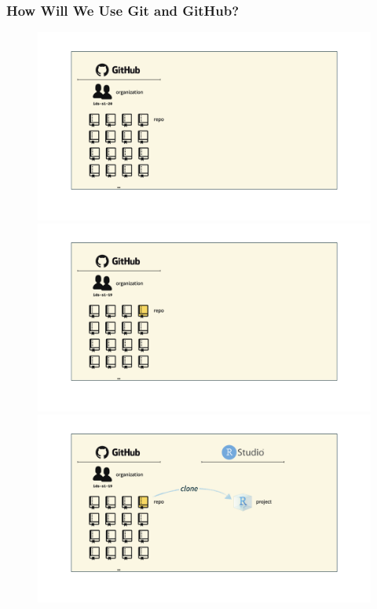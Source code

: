 \documentclass[11pt]{beamer}
\begin{document}
\begin{frame}
	\frametitle{\textbf{How Will We Use Git and GitHub?}}
	\begin{figure}
		\vspace{-1em}
		\begin{overprint}
			\centering\includegraphics[width=1\linewidth]{Images/S1/whole-game-01}
			\onslide<2>\centering\includegraphics[width=1\linewidth]{Images/S1/whole-game-02}
			\onslide<3>\centering\includegraphics[width=1\linewidth]{Images/S1/whole-game-03}

\end{overprint}
\end{figure}
\end{frame}
\end{document}
